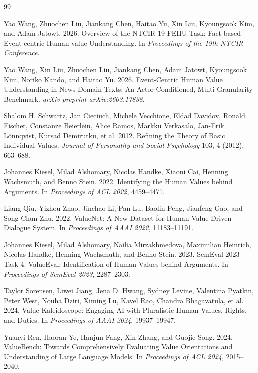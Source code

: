 \documentclass[sigconf,article,a4paper]{acmart}
\begin{document}
\begin{thebibliography}{99}

Yao Wang, Zhuochen Liu, Jiankang Chen, Haitao Yu, Xin Liu, Kyoungsook Kim,
and Adam Jatowt. 2026.
Overview of the NTCIR-19 FEHU Task: Fact-based Event-centric Human-value
Understanding. In \emph{Proceedings of the 19th NTCIR Conference}.

Yao Wang, Xin Liu, Zhuochen Liu, Jiankang Chen, Adam Jatowt, Kyoungsook Kim,
Noriko Kando, and Haitao Yu. 2026.
Event-Centric Human Value Understanding in News-Domain Texts: An
Actor-Conditioned, Multi-Granularity Benchmark.
\emph{arXiv preprint arXiv:2603.17838}.

Shalom H. Schwartz, Jan Cieciuch, Michele Vecchione, Eldad Davidov, Ronald
Fischer, Constanze Beierlein, Alice Ramos, Markku Verkasalo, Jan-Erik
L\"onnqvist, Kursad Demirutku, et al. 2012.
Refining the Theory of Basic Individual Values.
\emph{Journal of Personality and Social Psychology} 103, 4 (2012), 663--688.

Johannes Kiesel, Milad Alshomary, Nicolas Handke, Xiaoni Cai, Henning
Wachsmuth, and Benno Stein. 2022.
Identifying the Human Values behind Arguments.
In \emph{Proceedings of ACL 2022}, 4459--4471.

Liang Qiu, Yizhou Zhao, Jinchao Li, Pan Lu, Baolin Peng, Jianfeng Gao, and
Song-Chun Zhu. 2022.
ValueNet: A New Dataset for Human Value Driven Dialogue System.
In \emph{Proceedings of AAAI 2022}, 11183--11191.

Johannes Kiesel, Milad Alshomary, Nailia Mirzakhmedova, Maximilian Heinrich,
Nicolas Handke, Henning Wachsmuth, and Benno Stein. 2023.
SemEval-2023 Task 4: ValueEval: Identification of Human Values behind Arguments.
In \emph{Proceedings of SemEval-2023}, 2287--2303.

Taylor Sorensen, Liwei Jiang, Jena D. Hwang, Sydney Levine, Valentina Pyatkin,
Peter West, Nouha Dziri, Ximing Lu, Kavel Rao, Chandra Bhagavatula, et al. 2024.
Value Kaleidoscope: Engaging AI with Pluralistic Human Values, Rights, and
Duties. In \emph{Proceedings of AAAI 2024}, 19937--19947.

Yuanyi Ren, Haoran Ye, Hanjun Fang, Xin Zhang, and Guojie Song. 2024.
ValueBench: Towards Comprehensively Evaluating Value Orientations and
Understanding of Large Language Models.
In \emph{Proceedings of ACL 2024}, 2015--2040.


\end{thebibliography}
\end{document}
